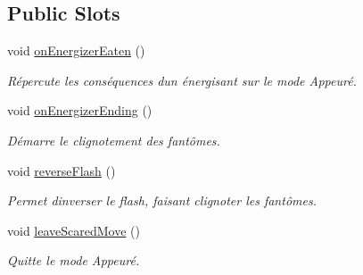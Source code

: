 \subsection*{Public Slots}
\begin{DoxyCompactItemize}
\item 
\hypertarget{class_level_ab0df304172dc4b1c3965248c4945e776}{}void \hyperlink{class_level_ab0df304172dc4b1c3965248c4945e776}{on\+Energizer\+Eaten} ()\label{class_level_ab0df304172dc4b1c3965248c4945e776}

\begin{DoxyCompactList}\small\item\em Répercute les conséquences d\textquotesingle{}un énergisant sur le mode Appeuré. \end{DoxyCompactList}\item 
\hypertarget{class_level_a4d68a82f73a3519330498c33015bc1a5}{}void \hyperlink{class_level_a4d68a82f73a3519330498c33015bc1a5}{on\+Energizer\+Ending} ()\label{class_level_a4d68a82f73a3519330498c33015bc1a5}

\begin{DoxyCompactList}\small\item\em Démarre le clignotement des fantômes. \end{DoxyCompactList}\item 
\hypertarget{class_level_a8906592d63bc309d535bce9e3af038b6}{}void \hyperlink{class_level_a8906592d63bc309d535bce9e3af038b6}{reverse\+Flash} ()\label{class_level_a8906592d63bc309d535bce9e3af038b6}

\begin{DoxyCompactList}\small\item\em Permet d\textquotesingle{}inverser le flash, faisant clignoter les fantômes. \end{DoxyCompactList}\item 
\hypertarget{class_level_ab44d383ae2a854964e5a991b0c3636ac}{}void \hyperlink{class_level_ab44d383ae2a854964e5a991b0c3636ac}{leave\+Scared\+Move} ()\label{class_level_ab44d383ae2a854964e5a991b0c3636ac}

\begin{DoxyCompactList}\small\item\em Quitte le mode Appeuré. \end{DoxyCompactList}\end{DoxyCompactItemize}
